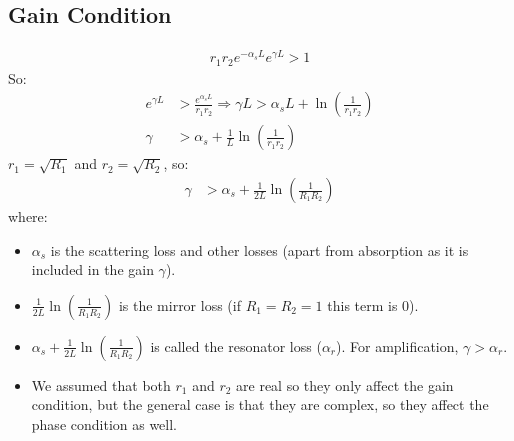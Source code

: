 \documentclass[11pt]{article}
\begin{document}
\subsection{Gain Condition}
\begin{align*}
    r_1 r_2 e^{-\alpha_s L} e^{\gamma L} > 1
\end{align*}
So:
\begin{align*}
    e^{\gamma L} &> \frac{e^{\alpha_s L}}{r_1 r_2} \Rightarrow \gamma L > \alpha_s L + \ln(\frac{1}{r_1 r_2}) \\
    \gamma &> \alpha_s + \frac{1}{L} \ln \left( \frac{1}{r_1 r_2} \right)
\end{align*}
$r_1 = \sqrt{R_1}$ and $r_2 = \sqrt{R_2}$, so:
\begin{align*}
    \gamma &> \alpha_s + \frac{1}{2L} \ln \left( \frac{1}{R_1 R_2} \right)
\end{align*}
where:
\begin{itemize}
    \item $\alpha_s$ is the scattering loss and other losses (apart from absorption as it is included in the gain $\gamma$). 
    \item $\frac{1}{2L} \ln \left( \frac{1}{R_1 R_2} \right)$ is the mirror loss (if $R_1=R_2=1$ this term is 0).
    \item $\alpha_s + \frac{1}{2L} \ln \left( \frac{1}{R_1 R_2} \right)$ is called the resonator loss ($\alpha_r$). For amplification, $\gamma > \alpha_r$.
    \item We assumed that both $r_1$ and $r_2$ are real so they only affect the gain condition, but the general case is that they are complex, so they affect the phase condition as well.
\end{itemize}
\end{document}
